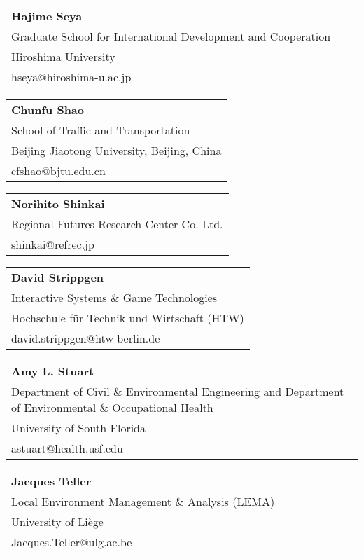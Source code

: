 \begin{tabular}[width=0.48\textwidth]{@{}l}
\textbf{Hajime Seya} \\
Graduate School for International Development and Cooperation \\
Hiroshima University \\
hseya@hiroshima-u.ac.jp  \\
\end{tabular}

\begin{tabular}[width=0.48\textwidth]{@{}l}
\textbf{Chunfu Shao} \\
School of Traffic and Transportation \\
Beijing Jiaotong University, Beijing, China \\
cfshao@bjtu.edu.cn \\
\end{tabular}

\begin{tabular}[width=0.48\textwidth]{@{}l}
\textbf{Norihito Shinkai} \\
Regional Futures Research Center Co. Ltd.\\ 
shinkai@refrec.jp\\ 
\end{tabular}

\begin{tabular}[width=0.48\textwidth]{@{}l}
\textbf{David Strippgen} \\
Interactive Systems \& Game Technologies \\
Hochschule für Technik und Wirtschaft (HTW) \\
david.strippgen@htw-berlin.de \\
\end{tabular}

\begin{tabular}[width=0.48\textwidth]{@{}l}
\textbf{Amy L. Stuart} \\
Department of Civil \& Environmental Engineering and Department of Environmental \& Occupational Health\\
University of South Florida \\
astuart@health.usf.edu \\
\end{tabular}

\begin{tabular}[width=0.48\textwidth]{@{}l}
\textbf{Jacques Teller} \\
Local Environment Management \& Analysis (LEMA) \\
University of Liège \\
Jacques.Teller@ulg.ac.be \\
\end{tabular}

